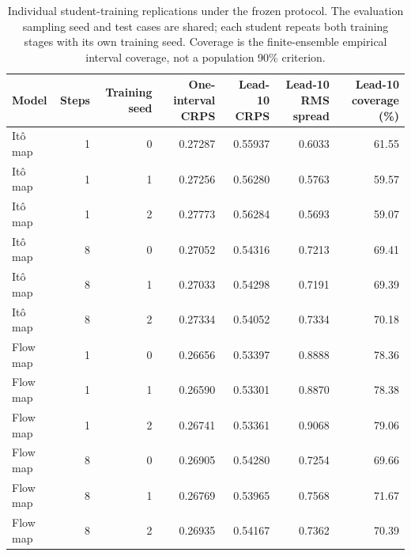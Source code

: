 \begin{table}[t]
\caption{Individual student-training replications under the frozen protocol. The evaluation sampling seed and test cases are shared; each student repeats both training stages with its own training seed. Coverage is the finite-ensemble empirical interval coverage, not a population 90\% criterion.}
\label{tab:individual-seeds}
\centering
\setlength{\tabcolsep}{4pt}
\begin{tabular}{lrrrrrr}
\toprule
Model & Steps & Training seed & One-interval CRPS & Lead-10 CRPS & Lead-10 RMS spread & Lead-10 coverage (\%) \\
\midrule
It\^o map & 1 & 0 & 0.27287 & 0.55937 & 0.6033 & 61.55 \\
It\^o map & 1 & 1 & 0.27256 & 0.56280 & 0.5763 & 59.57 \\
It\^o map & 1 & 2 & 0.27773 & 0.56284 & 0.5693 & 59.07 \\
It\^o map & 8 & 0 & 0.27052 & 0.54316 & 0.7213 & 69.41 \\
It\^o map & 8 & 1 & 0.27033 & 0.54298 & 0.7191 & 69.39 \\
It\^o map & 8 & 2 & 0.27334 & 0.54052 & 0.7334 & 70.18 \\
Flow map & 1 & 0 & 0.26656 & 0.53397 & 0.8888 & 78.36 \\
Flow map & 1 & 1 & 0.26590 & 0.53301 & 0.8870 & 78.38 \\
Flow map & 1 & 2 & 0.26741 & 0.53361 & 0.9068 & 79.06 \\
Flow map & 8 & 0 & 0.26905 & 0.54280 & 0.7254 & 69.66 \\
Flow map & 8 & 1 & 0.26769 & 0.53965 & 0.7568 & 71.67 \\
Flow map & 8 & 2 & 0.26935 & 0.54167 & 0.7362 & 70.39 \\
\bottomrule
\end{tabular}
\end{table}
